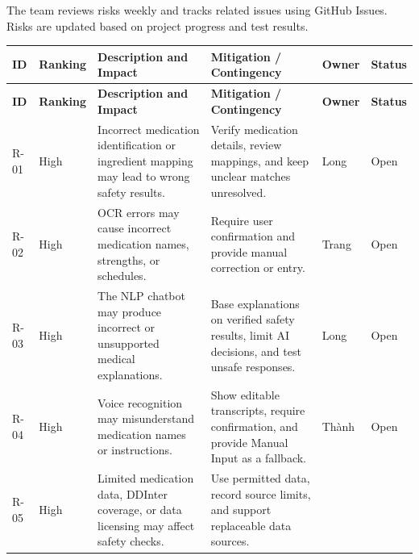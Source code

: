The team reviews risks weekly and tracks
related issues using GitHub Issues.
Risks are updated based on project
progress and test results.

\begin{longtable}{|
    L{0.07\textwidth}|
    L{0.10\textwidth}|
    L{0.25\textwidth}|
    L{0.29\textwidth}|
    L{0.10\textwidth}|
    L{0.07\textwidth}|
}
\hline

\textbf{ID} &
\textbf{Ranking} &
\textbf{Description and Impact} &
\textbf{Mitigation / Contingency} &
\textbf{Owner} &
\textbf{Status}
\\ \hline

\endfirsthead

\hline
\textbf{ID} &
\textbf{Ranking} &
\textbf{Description and Impact} &
\textbf{Mitigation / Contingency} &
\textbf{Owner} &
\textbf{Status}
\\ \hline

\endhead


R-01
& High
& Incorrect medication identification
or ingredient mapping may lead to
wrong safety results.
& Verify medication details, review mappings,
and keep unclear matches unresolved.
& Long
& Open
\\ \hline


R-02
& High
& OCR errors may cause incorrect
medication names, strengths,
or schedules.
& Require user confirmation and provide
manual correction or entry.
& Trang
& Open
\\ \hline


R-03
& High
& The NLP chatbot may produce
incorrect or unsupported
medical explanations.
& Base explanations on verified
safety results, limit AI decisions,
and test unsafe responses.
& Long
& Open
\\ \hline


R-04
& High
& Voice recognition may misunderstand
medication names or instructions.
& Show editable transcripts,
require confirmation, and provide
Manual Input as a fallback.
& Thành
& Open
\\ \hline


R-05
& High
& Limited medication data,
DDInter coverage, or data licensing
may affect safety checks.
& Use permitted data, record source
limits, and support replaceable
data sources.


\end{longtable}
